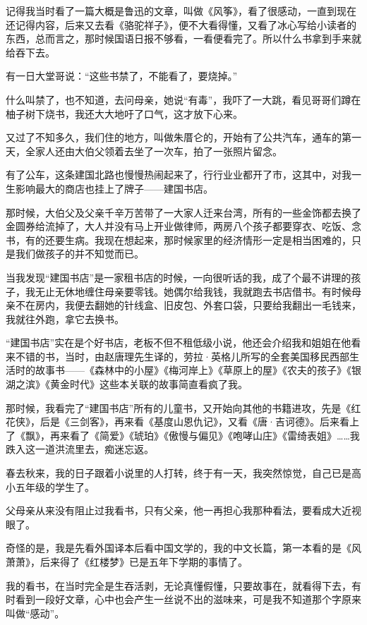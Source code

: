 \par 记得我当时看了一篇大概是鲁迅的文章，叫做《风筝》，看了很感动，一直到现在还记得内容，后来又去看《骆驼祥子》，便不大看得懂，又看了冰心写给小读者的东西，总而言之，那时候国语日报不够看，一看便看完了。所以什么书拿到手来就给吞下去。
\par 有一日大堂哥说：“这些书禁了，不能看了，要烧掉。”
\par 什么叫禁了，也不知道，去问母亲，她说“有毒”，我吓了一大跳，看见哥哥们蹲在柚子树下烧书，我还大大地吁了口气，这才放下心来。
\par 又过了不知多久，我们住的地方，叫做朱厝仑的，开始有了公共汽车，通车的第一天，全家人还由大伯父领着去坐了一次车，拍了一张照片留念。
\par 有了公车，这条建国北路也慢慢热闹起来了，行行业业都开了市，这其中，对我一生影响最大的商店也挂上了牌子——建国书店。
\par 那时候，大伯父及父亲千辛万苦带了一大家人迁来台湾，所有的一些金饰都去换了金圆券给流掉了，大人并没有马上开业做律师，两房八个孩子都要穿衣、吃饭、念书，有的还要生病。我现在想起来，那时候家里的经济情形一定是相当困难的，只是我们做孩子的并不知觉而已。
\par 当我发现“建国书店”是一家租书店的时候，一向很听话的我，成了个最不讲理的孩子，我无止无休地缠住母亲要零钱。她偶尔给我钱，我就跑去书店借书。有时候母亲不在房内，我便去翻她的针线盒、旧皮包、外套口袋，只要给我翻出一毛钱来，我就往外跑，拿它去换书。
\par “建国书店”实在是个好书店，老板不但不租低级小说，他还会介绍我和姐姐在他看来不错的书，当时，由赵唐理先生译的，劳拉·英格儿所写的全套美国移民西部生活时的故事书——《森林中的小屋》《梅河岸上》《草原上的屋》《农夫的孩子》《银湖之滨》《黄金时代》这些本关联的故事简直看疯了我。
\par 那时候，我看完了“建国书店”所有的儿童书，又开始向其他的书籍进攻，先是《红花侠》，后是《三剑客》，再来看《基度山恩仇记》，又看《唐·吉诃德》。后来看上了《飘》，再来看了《简爱》《琥珀》《傲慢与偏见》《咆哮山庄》《雷绮表姐》……我跌入这一道洪流里去，痴迷忘返。
\par 春去秋来，我的日子跟着小说里的人打转，终于有一天，我突然惊觉，自己已是高小五年级的学生了。
\par 父母亲从来没有阻止过我看书，只有父亲，他一再担心我那种看法，要看成大近视眼了。
\par 奇怪的是，我是先看外国译本后看中国文学的，我的中文长篇，第一本看的是《风萧萧》，后来得了《红楼梦》已是五年下学期的事情了。
\par 我的看书，在当时完全是生吞活剥，无论真懂假懂，只要故事在，就看得下去，有时看到一段好文章，心中也会产生一丝说不出的滋味来，可是我不知道那个字原来叫做“感动”。

